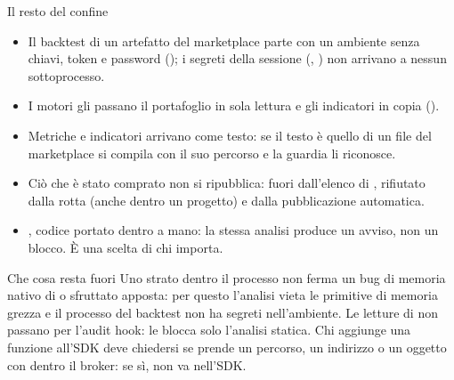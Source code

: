 \begin{nota}{Il resto del confine}
\begin{itemize}
  \item Il backtest di un artefatto del marketplace parte con un ambiente
        senza chiavi, token e password ();
        i segreti della sessione (, )
        non arrivano a nessun sottoprocesso.
  \item I motori gli passano il portafoglio in sola lettura e gli indicatori
        in copia ().
  \item Metriche e indicatori arrivano come testo: se il testo è quello di
        un file del marketplace si compila con il suo percorso e la guardia
        li riconosce.
  \item Ciò che è stato comprato non si ripubblica: fuori dall'elenco di
        , rifiutato dalla rotta (anche dentro un progetto) e dalla
        pubblicazione automatica.
  \item {}, codice portato dentro a mano: la stessa
        analisi produce un avviso, non un blocco. È una scelta di chi importa.
\end{itemize}
\end{nota}

\begin{attenzione}{Che cosa resta fuori}
Uno strato dentro il processo non ferma un bug di memoria nativo di
 o  sfruttato apposta: per questo l'analisi vieta le
primitive di memoria grezza e il processo del backtest non ha segreti
nell'ambiente. Le letture di  non passano per l'audit hook:
le blocca solo l'analisi statica. Chi aggiunge una funzione all'SDK deve
chiedersi se prende un percorso, un indirizzo o un oggetto con dentro il
broker: se sì, non va nell'SDK.
\end{attenzione}
